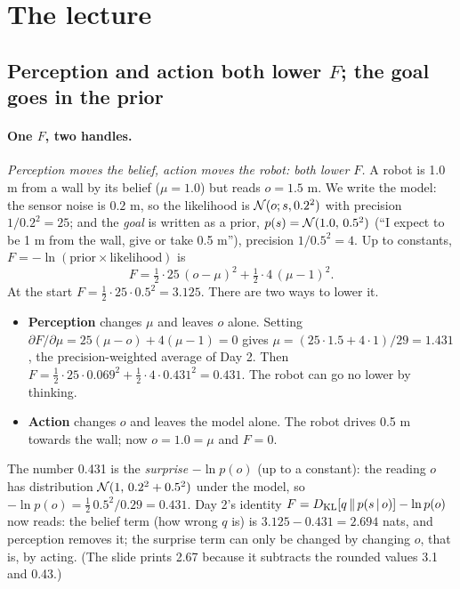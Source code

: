\documentclass[11pt]{article}
\newcommand{\slt}[1]{\emph{#1}}   %
\begin{document}
\section{The lecture}

\subsection{Perception and action both lower $F$; the goal goes in the prior}

\paragraph{One $F$, two handles.} \slt{Perception moves the belief, action moves the robot: both lower $F$.} A robot is 1.0 m from a wall by its belief ($\mu=1.0$) but reads $o=1.5$ m. We write the model: the sensor noise is $0.2$ m, so the likelihood is $\mathcal{N}(o;s,0.2^2)$ with precision $1/0.2^2=25$; and the \emph{goal} is written as a prior, $p(s)=\mathcal{N}(1.0,\,0.5^2)$ (``I expect to be 1 m from the wall, give or take 0.5 m''), precision $1/0.5^2=4$. Up to constants, $F=-\ln(\text{prior}\times\text{likelihood})$ is
\[
F=\tfrac12\cdot 25\,(o-\mu)^2+\tfrac12\cdot 4\,(\mu-1)^2 .
\]
At the start $F=\tfrac12\cdot25\cdot0.5^2=3.125$. There are two ways to lower it.
\begin{itemize}
\item \textbf{Perception} changes $\mu$ and leaves $o$ alone. Setting $\partial F/\partial\mu=25(\mu-o)+4(\mu-1)=0$ gives $\mu=(25\cdot1.5+4\cdot1)/29=1.431$, the precision-weighted average of Day 2. Then $F=\tfrac12\cdot25\cdot0.069^2+\tfrac12\cdot4\cdot0.431^2=0.431$. The robot can go no lower by thinking.
\item \textbf{Action} changes $o$ and leaves the model alone. The robot drives 0.5 m towards the wall; now $o=1.0=\mu$ and $F=0$.
\end{itemize}
The number 0.431 is the \emph{surprise} $-\ln p(o)$ (up to a constant): the reading $o$ has distribution $\mathcal{N}(1,\,0.2^2+0.5^2)$ under the model, so $-\ln p(o)=\tfrac12\,0.5^2/0.29=0.431$. Day 2's identity $F=D_{\mathrm{KL}}\!\left[q\,\middle\|\,p(s\,|\, o)\right]-\ln p(o)$ now reads: the belief term (how wrong $q$ is) is $3.125-0.431=2.694$ nats, and perception removes it; the surprise term can only be changed by changing $o$, that is, by acting. (The slide prints 2.67 because it subtracts the rounded values 3.1 and 0.43.)
\end{document}
